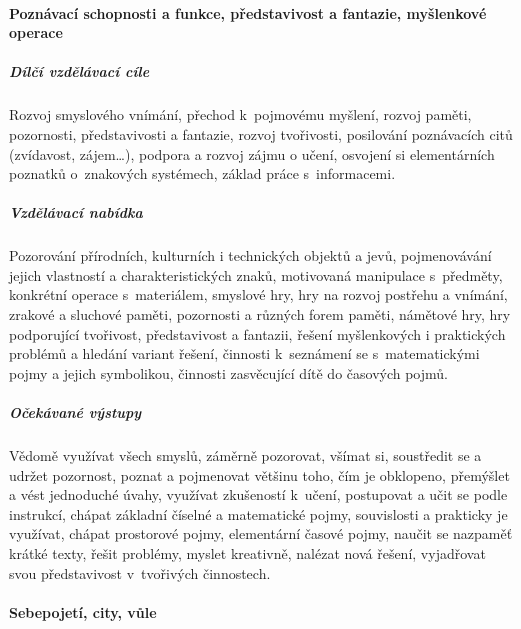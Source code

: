 				\paragraph{Poznávací schopnosti a funkce, představivost a fantazie, myšlenkové operace}

					\subparagraph{Dílčí vzdělávací cíle}
						Rozvoj smyslového vnímání, přechod k pojmovému myšlení, rozvoj paměti, pozornosti, představivosti a fantazie, rozvoj tvořivosti, posilování poznávacích citů (zvídavost, zájem…), podpora a rozvoj zájmu o učení, osvojení si elementárních poznatků o znakových systémech, základ práce s informacemi.
					\subparagraph{Vzdělávací nabídka}
						Pozorování přírodních, kulturních i technických objektů a jevů, pojmenovávání jejich vlastností a charakteristických znaků, motivovaná manipulace s předměty, konkrétní operace s materiálem, smyslové hry, hry na rozvoj postřehu a vnímání, zrakové a sluchové paměti, pozornosti a různých forem paměti, námětové hry, hry podporující tvořivost, představivost a fantazii, řešení myšlenkových i praktických problémů a hledání variant řešení, činnosti k seznámení se s matematickými pojmy a jejich symbolikou, činnosti zasvěcující dítě do časových pojmů.
					\subparagraph{Očekávané výstupy}
						Vědomě využívat všech smyslů, záměrně pozorovat, všímat si, soustředit se a udržet pozornost, poznat a pojmenovat většinu toho, čím je obklopeno, přemýšlet a vést jednoduché úvahy, využívat zkušeností k učení, postupovat a učit se podle instrukcí, chápat základní číselné a matematické pojmy, souvislosti a prakticky je využívat, chápat prostorové pojmy, elementární časové pojmy, naučit se nazpaměť krátké texty, řešit problémy, myslet kreativně, nalézat nová řešení, vyjadřovat svou představivost v tvořivých činnostech.

				\paragraph{Sebepojetí, city, vůle}

